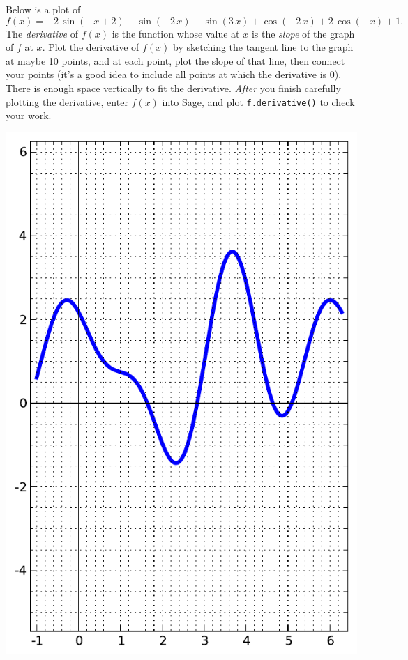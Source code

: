 Below is a plot of $$f(x)=-2 \, \sin\left(-x + 2\right) - \sin\left(-2 \, x\right) - \sin\left(3 \, x\right) + \cos\left(-2 \, x\right) + 2 \, \cos\left(-x\right) + 1.$$  The {\em \color{red}derivative} of $f(x)$ is the function whose value at $x$ is the {\em slope} of the graph of $f$ at $x$.  Plot the derivative of $f(x)$ by sketching the tangent line to the graph at maybe 10 points, and at each point, plot the slope of that line, then connect your points (it's a good idea to include all points at which the derivative is 0).  There is enough space vertically to fit the derivative.  {\em After} you finish carefully plotting the derivative, enter $f(x)$ into Sage, and plot {\color{blue}\verb|f.derivative()|} to check your work.
\begin{center}\includegraphics{functions/78.pdf}\end{center}\newpage

